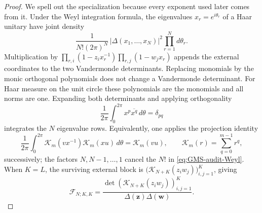 \begin{proof}
We spell out the specialization because every exponent used later comes from it.  Under the
Weyl integration formula, the eigenvalues $x_r=e^{i\theta_r}$ of a Haar unitary have joint
density
\begin{equation}
 \frac{1}{N!(2\pi)^N}\,|\Delta(x_1,\ldots,x_N)|^2
 \prod_{r=1}^{N}d\theta_r.
 \label{eq:GMS-audit-Weyl}
\end{equation}
Multiplication by
$\prod_{r,i}(1-z_i x_r^{-1})\prod_{r,j}(1-w_jx_r)$ appends the external
coordinates to the two Vandermonde determinants.  Replacing monomials by the monic
orthogonal polynomials does not change a Vandermonde determinant.  For Haar measure on the
unit circle these polynomials are the monomials and all norms are one.  Expanding both
determinants and applying orthogonality
\begin{equation}
 \frac1{2\pi}\int_0^{2\pi}x^p\overline{x^q}\,d\theta=\delta_{pq}
 \label{eq:GMS-audit-circle-orthogonality}
\end{equation}
integrates the $N$ eigenvalue rows.  Equivalently, one applies the projection identity
\begin{equation}
 \frac1{2\pi}\int_0^{2\pi}
 \mathcal K_m(vx^{-1})\mathcal K_m(xu)\,d\theta
 =\mathcal K_m(vu),
 \qquad \mathcal K_m(r)=\sum_{q=0}^{m-1}r^q,
 \label{eq:GMS-audit-projection-kernel}
\end{equation}
successively; the factors $N,N-1,\ldots,1$ cancel the $N!$ in
\eqref{eq:GMS-audit-Weyl}.  When $K=L$, the surviving external block is
$\bigl(\mathcal K_{N+K}(z_iw_j)\bigr)_{i,j=1}^{K}$, giving
\begin{equation}
 \mathcal F_{N;K,K}
 =\frac{\det(\mathcal K_{N+K}(z_iw_j))_{i,j=1}^{K}}
 {\Delta(\mathbf z)\Delta(\mathbf w)}.
 \label{eq:GMS-audit-equal-determinant}
\end{equation}


\end{proof}
